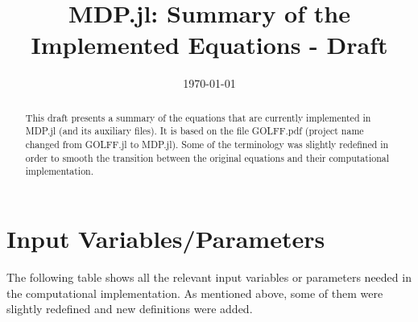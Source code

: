 \documentclass[12pt]{article}
\begin{document}
\title{MDP.jl: Summary of the Implemented Equations - Draft}

\date{\today}

%
\maketitle

\begin{abstract}
This draft presents a summary of the equations that are currently implemented in MDP.jl (and its auxiliary files). It is based on the file GOLFF.pdf (project name changed from GOLFF.jl to MDP.jl). 
Some of the terminology was slightly redefined in order to smooth the transition between the original equations and their computational implementation.
\end{abstract}

\section{Input Variables/Parameters}

The following table shows all the relevant input variables or parameters needed in the computational implementation. As mentioned above, some of them were slightly redefined and new definitions were added. 
\end{document}
